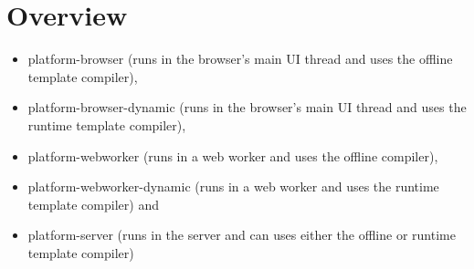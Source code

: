 \section{Overview}




\begin{itemize}
  \item platform-browser (runs in the browser’s main UI thread and uses the offline template compiler),
  \item platform-browser-dynamic (runs in the browser’s main UI thread and uses the runtime template compiler),
  \item platform-webworker (runs in a web worker and uses the offline compiler),
  \item platform-webworker-dynamic (runs in a web worker and uses the runtime template compiler) and
  \item platform-server (runs in the server and can uses either the offline or runtime template compiler)
\end{itemize}


